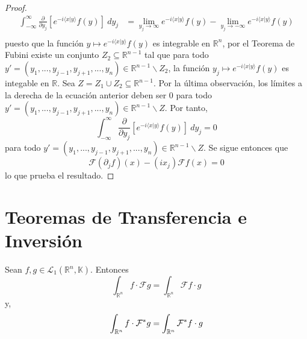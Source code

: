 \documentclass[12pt]{report}
\newcounter{it}
\theoremstyle{largebreak}
\newcommand\pint[2]{\ensuremath{\langle#1| #2\rangle}}
\newcommand{\fou}[1]{\ensuremath{\mathcal{F}#1}}
\begin{document}
\begin{proof}
        \begin{equation*}
            \begin{split}
                \int_{-\infty}^\infty\frac{\partial}{\partial y_j}\left[e^{-i\pint{x}{y}}f(y)\right] \:dy_j&=\lim_{ y_j\rightarrow\infty}e^{ -i\pint{x}{y}}f(y)-\lim_{ y_j\rightarrow-\infty}e^{ -i\pint{x}{y}}f(y)\\
            \end{split}
        \end{equation*}
        puesto que la función $y\mapsto e^{ -i\pint{x}{y}}f(y)$ es integrable en $\mathbb{R}^n$, por el Teorema de Fubini existe un conjunto $Z_2\subseteq\mathbb{R}^{ n-1}$ tal que para todo $y'=(y_1,...,y_{ j-1},y_{ j+1},...,y_n)\in\mathbb{R}^{ n-1}\backslash Z_2$, la función $y_j\mapsto e^{ -i\pint{x}{y}}f(y)$ es integable en $\mathbb{R}$. Sea $Z=Z_1\cup Z_2\subseteq\mathbb{R}^{ n-1}$. Por la última observación, los límites a la derecha de la ecuación anterior deben ser $0$ para todo $y'=(y_1,...,y_{ j-1},y_{ j+1},...,y_n)\in\mathbb{R}^{n-1}\backslash Z$. Por tanto,
        \begin{equation*}
            \int_{-\infty}^\infty\frac{\partial}{\partial y_j}\left[e^{-i\pint{x}{y}}f(y)\right] \:dy_j =0
        \end{equation*}
        para todo $y'=(y_1,...,y_{ j-1},y_{ j+1},...,y_n)\in\mathbb{R}^{n-1}\backslash Z$. Se sigue entonces que
        \begin{equation*}
            \fou{(\partial_jf)}(x)-(ix_j)\fou{f}(x)=0
        \end{equation*}
        lo que prueba el resultado.
    \end{proof}

    \section{Teoremas de Transferencia e Inversión}

    \begin{theor}
        Sean $f,g\in\mathcal{L}_1(\mathbb{R}^n,\mathbb{K})$. Entonces
        \begin{equation*}
            \int_{\mathbb{R}^n}f\cdot\fou{g}=\int_{\mathbb{R}^n}\fou{f}\cdot g
        \end{equation*}
        y,
        \begin{equation*}
            \int_{\mathbb{R}^n}f\cdot\fou^*{g}=\int_{\mathbb{R}^n}\fou^*{f}\cdot g
        \end{equation*}
    \end{theor}
\end{document}

